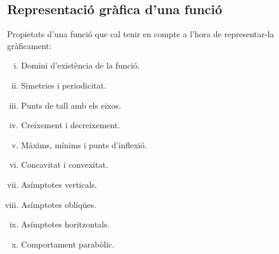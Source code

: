 \subsection{Representació gràfica d'una funció}
Propietats d'una funció que cal tenir en compte  a l'hora de representar-la gràficament:
\begin{enumerate}[i)]
    \item Domini d'existència de la funció.
    \item Simetries i periodicitat.
    \item Punts de tall amb els eixos.
    \item Creixement i decreixement.
    \item Màxims, mínims i punts d'inflexió.
    \item Concavitat i convexitat.
    \item Asímptotes verticals.
    \item Asímptotes oblíqües.
    \item Asímptotes horitzontals.
    \item Comportament parabòlic.
\end{enumerate}